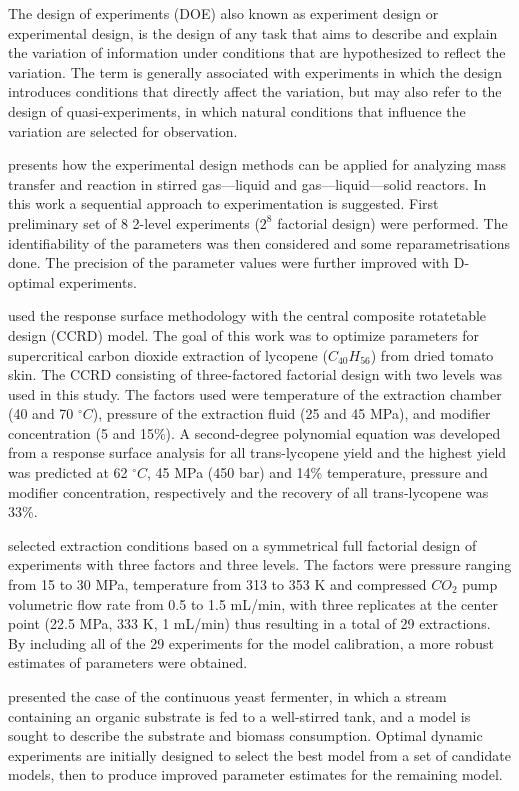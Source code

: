 \documentclass[../Article_Design_of_Experiment.tex]{subfiles}
\begin{document}
	
	The design of experiments (DOE) also known as experiment design or experimental design, is the design of any task that aims to describe and explain the variation of information under conditions that are hypothesized to reflect the variation. The term is generally associated with experiments in which the design introduces conditions that directly affect the variation, but may also refer to the design of quasi-experiments, in which natural conditions that influence the variation are selected for observation.
		
	\citet{Oinas1992} presents how the experimental design methods can be applied for analyzing mass transfer and reaction in stirred gas—liquid and gas—liquid—solid reactors. In this work a sequential approach to experimentation is suggested. First preliminary set of 8 2-level experiments ($2^8$ factorial design) were performed. The identifiability of the parameters was then considered and some reparametrisations done. The precision of the parameter values were further improved with D-optimal experiments. 
	
	\citet{Kassama2008} used the response surface methodology with the central composite rotatetable design (CCRD) model. The goal of this work was to optimize parameters for supercritical carbon dioxide extraction of lycopene ($C_{40}H_{56}$) from dried tomato skin. The CCRD consisting of three-factored factorial design with two levels was used in this study. The factors used were temperature of the extraction chamber (40 and 70 $^\circ C$), pressure of the extraction fluid (25 and 45 MPa), and modifier concentration (5 and 15\%). A second-degree polynomial equation was developed from a response surface analysis for all trans-lycopene yield and the highest yield was predicted at 62 $^\circ C$, 45 MPa (450 bar) and 14\% temperature, pressure and modifier concentration, respectively and the recovery of all trans-lycopene was 33\%.
	
	\citet{Abrahamsson2016} selected extraction conditions based on a symmetrical full factorial design of experiments with three factors and three levels. The factors were pressure ranging from 15 to 30 MPa, temperature from 313 to 353 K and compressed $CO_2$ pump volumetric flow rate from 0.5 to 1.5 mL/min, with three replicates at the center point (22.5 MPa, 333 K, 1 mL/min) thus resulting in a total of 29 extractions. By including all of the 29 experiments for the model calibration, a more robust estimates of parameters were obtained.
	
	\citet{Espie1989} presented the case of the continuous yeast fermenter, in which a stream containing an organic substrate is fed to a well-stirred tank, and a model is sought to describe the substrate and biomass consumption. Optimal dynamic experiments are initially designed to select the best model from a set of candidate models, then to produce improved parameter estimates for the remaining model.
	
\end{document}
